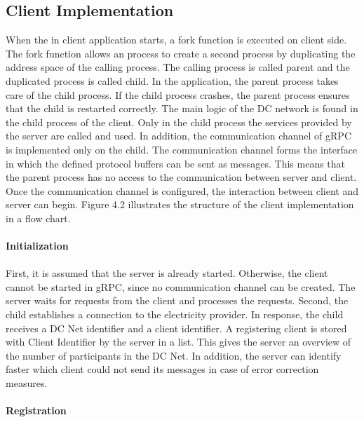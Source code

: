 \subsection{Client Implementation}
When the in client application starts, a fork function is executed on client side. The fork function allows an process to create a second process by duplicating the address space of the calling process. The calling process is called parent and the duplicated process is called child. In the application, the parent process takes care of the child process. If the child process crashes, the parent process ensures that the child is restarted correctly. The main logic of the DC network is found in the child process of the client. Only in the child process the services provided by the server are called and used. In addition, the communication channel of gRPC is implemented only on the child. The communication channel forms the interface in which the defined protocol buffers can be sent as messages. This means that the parent process has no access to the communication between server and client. Once the communication channel is configured, the interaction between client and server can begin. Figure 4.2 illustrates the structure of the client implementation in a flow chart.
\\
\\
\textbf{Initialization}
\\
\\
First, it is assumed that the server is already started. Otherwise, the client cannot be started in gRPC, since no communication channel can be created. The server waits for requests from the client and processes the requests. Second, the child establishes a connection to the electricity provider. In response, the child receives a DC Net identifier and a client identifier. A registering client is stored with Client Identifier by the server in a list. This gives the server an overview of the number of participants in the DC Net. In addition, the server can identify faster which client could not send its messages in case of error correction measures. \\
\\
\textbf{Registration}
\\
\\
